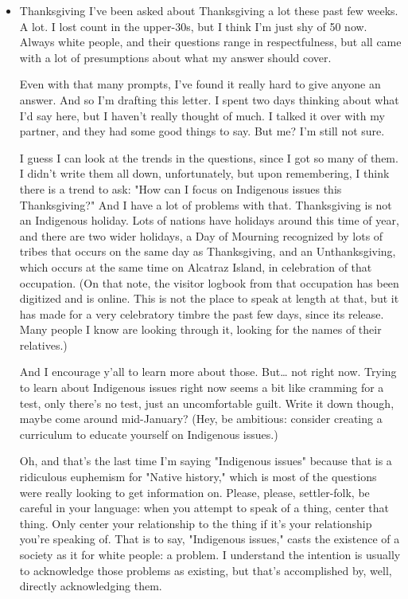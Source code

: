 \documentclass[11pt]{article}
\begin{document}
\begin{itemize}
\item Thanksgiving
\label{sec:orgced9813}
I've been asked about Thanksgiving a lot these past few weeks. A lot. I lost count in the upper-30s, but I think I'm just shy of 50 now. Always white people, and their questions range in respectfulness, but all came with a lot of presumptions about what my answer should cover.

Even with that many prompts, I've found it really hard to give anyone an answer. And so I'm drafting this letter. I spent two days thinking about what I'd say here, but I haven't really thought of much. I talked it over with my partner, and they had some good things to say. But me? I'm still not sure.

I guess I can look at the trends in the questions, since I got so many of them. I didn't write them all down, unfortunately, but upon remembering, I think there is a trend to ask: "How can I focus on Indigenous issues this Thanksgiving?" And I have a lot of problems with that. Thanksgiving is not an Indigenous holiday. Lots of nations have holidays around this time of year, and there are two wider holidays, a Day of Mourning recognized by lots of tribes that occurs on the same day as Thanksgiving, and an Unthanksgiving, which occurs at the same time on Alcatraz Island, in celebration of that occupation. (On that note, the visitor logbook from that occupation has been digitized and is online. This is not the place to speak at length at that, but it has made for a very celebratory timbre the past few days, since its release. Many people I know are looking through it, looking for the names of their relatives.)

And I encourage y'all to learn more about those. But\ldots{} not right now. Trying to learn about Indigenous issues right now seems a bit like cramming for a test, only there's no test, just an uncomfortable guilt. Write it down though, maybe come around mid-January? (Hey, be ambitious: consider creating a curriculum to educate yourself on Indigenous issues.)

Oh, and that's the last time I'm saying "Indigenous issues" because that is a ridiculous euphemism for "Native history," which is most of the questions were really looking to get information on. Please, please, settler-folk, be careful in your language: when you attempt to speak of a thing, center that thing. Only center your relationship to the thing if it's your relationship you're speaking of. That is to say, "Indigenous issues," casts the existence of a society as it for white people: a problem. I understand the intention is usually to acknowledge those problems as existing, but that's accomplished by, well, directly acknowledging them.


\end{itemize}
\end{document}
